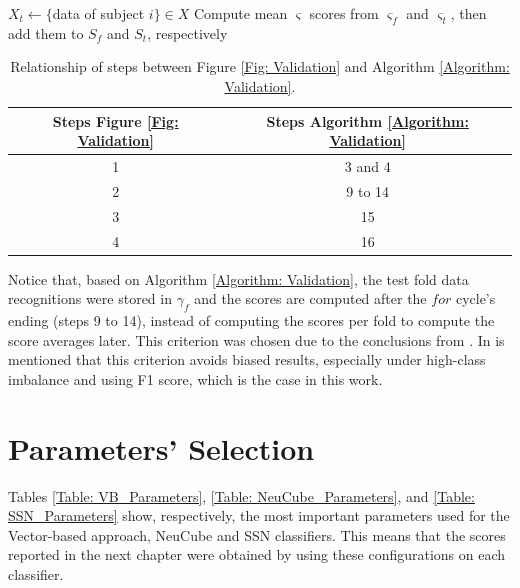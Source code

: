 \begin{algorithm}
\begin{algorithmic}[1]
{		\STATE $X_{t} \leftarrow \{$data of subject $i\} \in X$
		\ENDFOR
		\STATE Compute mean $\varsigma$ scores from $\varsigma_{f}$ and $\varsigma_{t}$, then add them to $S_{f}$ and $S_{t}$, respectively
	}
	\ENDFOR
\end{algorithmic}
\end{algorithm}

\begin{table}[h!]
\caption{Relationship of steps between Figure \ref{Fig: Validation} and Algorithm \ref{Algorithm: Validation}.}
\centering
\begin{tabular}{|c|c|}\hline
	\textbf{Steps Figure \ref{Fig: Validation}}&\textbf{Steps Algorithm \ref{Algorithm: Validation}}\\\hline
	1&3 and 4\\\hline
	2&9 to 14\\\hline
	3&15\\\hline
	4&16\\\hline
\end{tabular}
\label{Table: Validation_Relation}
\end{table}
\pagebreak

Notice that, based on Algorithm \ref{Algorithm: Validation}, the test fold data recognitions were stored in $\gamma_{f}$ and the scores are computed after the $for$ cycle's ending (steps 9 to 14), instead of computing the scores per fold to compute the score averages later. This criterion was chosen due to the conclusions from \cite{forman2010apples}. In \cite{forman2010apples} is mentioned that this criterion avoids biased results, especially under high-class imbalance and using F1 score, which is the case in this work.\\

\section{Parameters' Selection}
Tables \ref{Table: VB_Parameters}, \ref{Table: NeuCube_Parameters}, and \ref{Table: SSN_Parameters} show, respectively, the most important parameters used for the Vector-based approach, NeuCube and SSN classifiers. This means that the scores reported in the next chapter were obtained by using these configurations on each classifier.\\

